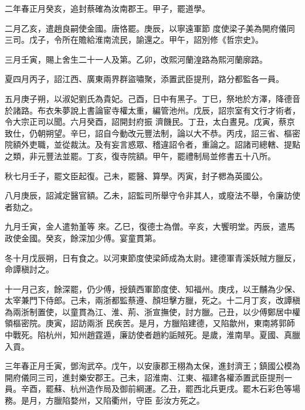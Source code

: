 \begin{pinyinscope}
 二年春正月癸亥，追封蔡確為汝南郡王。甲子，罷道學。



 二月乙亥，遣趙良嗣使金國。唐恪罷。庚辰，以寧遠軍節
 度使梁子美為開府儀同三司。戊子，令所在贍給淮南流民，諭還之。甲午，詔別修《哲宗史》。



 三月壬寅，賜上舍生二十一人及第。乙卯，改熙河蘭湟路為熙河蘭廓路。



 夏四月丙子，詔江西、廣東兩界群盜嘯聚，添置武臣提刑，路分都監各一員。



 五月庚子朔，以淑妃劉氏為貴妃。己酉，日中有黑子。丁巳，祭地於方澤，降德音於諸路。布衣朱夢說上書論宦寺權太重，編管池州。戊辰，詔宗室有文行才術者，令大宗正司以聞。六月癸酉，詔開封府振
 濟饑民。丁丑，太白晝見。戊寅，蔡京致仕，仍朝朔望。辛巳，詔自今動改元豐法制，論以大不恭。丙戌，詔三省、樞密院額外吏職，並從裁汰。及有妄言惑眾、稽違詔令者，重論之。詔諸司總轄、提點之類，非元豐法並罷。丁亥，復寺院額。甲午，罷禮制局並修書五十八所。



 秋七月壬子，罷文臣起復。己未，罷醫、算學。丙寅，封子楒為英國公。



 八月庚辰，詔減定醫官額。乙未，詔監司所舉守令非其人，或廢法不舉，令廉訪使者劾之。



 九月壬寅，金人遣勃堇等
 來。乙巳，復德士為僧。辛亥，大饗明堂。丙辰，遣馬政使金國。癸亥，餘深加少傅。宴童貫第。



 冬十月戊辰朔，日有食之。以河東節度使梁師成為太尉。建德軍青溪妖賊方臘反，命譚稹討之。



 十一月己亥，餘深罷，仍少傅，授鎮西軍節度使、知福州。庚戌，以王黼為少保、太宰兼門下侍郎。己未，兩浙都監蔡遵、顏坦擊方臘，死之。十二月丁亥，改譚稹為兩浙制置使，以童貫為江、淮、荊、浙宣撫使，討方臘。己丑，以少傅鄭居中權領樞密院。庚寅，詔訪兩浙
 民疾苦。是月，方臘陷建德，又陷歙州，東南將郭師中戰死。陷杭州，知州趙霆遁，廉訪使者趙約詬賊死。是歲，淮南旱。夏國、真臘入貢。



 三年春正月壬寅，鄧洵武卒。戊午，以安康郡王栩為太保，進封濟王；鎮國公模為開府儀同三司，進封樂安郡王。己未，詔淮南、江東、福建各權添置武臣提刑一員。辛酉，罷蘇、杭州造作局及御前綱運。乙丑，罷西北兵更戌。罷木石彩色等場務。是月，方臘陷婺州，又陷衢州，守臣
 彭汝方死之。




\end{pinyinscope}
